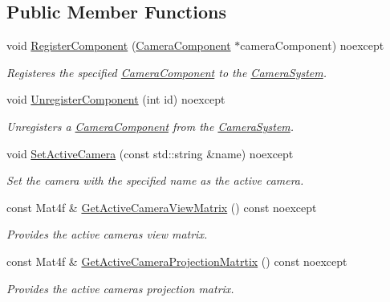 \subsection*{Public Member Functions}
\begin{DoxyCompactItemize}
\item 
void \hyperlink{class_blade_1_1_camera_system_a67a9d2ce6b3f06212dfe882dab6334c6}{Register\+Component} (\hyperlink{class_blade_1_1_camera_component}{Camera\+Component} $\ast$camera\+Component) noexcept
\begin{DoxyCompactList}\small\item\em Registeres the specified \hyperlink{class_blade_1_1_camera_component}{Camera\+Component} to the \hyperlink{class_blade_1_1_camera_system}{Camera\+System}. \end{DoxyCompactList}\item 
void \hyperlink{class_blade_1_1_camera_system_a295fdc352ab2c419940f43610cd06be7}{Unregister\+Component} (int id) noexcept
\begin{DoxyCompactList}\small\item\em Unregisters a \hyperlink{class_blade_1_1_camera_component}{Camera\+Component} from the \hyperlink{class_blade_1_1_camera_system}{Camera\+System}. \end{DoxyCompactList}\item 
void \hyperlink{class_blade_1_1_camera_system_a24ae6ba288185e4c2e915296e2b3a854}{Set\+Active\+Camera} (const std\+::string \&name) noexcept
\begin{DoxyCompactList}\small\item\em Set the camera with the specified name as the active camera. \end{DoxyCompactList}\item 
const Mat4f \& \hyperlink{class_blade_1_1_camera_system_a37ed2fa73706463322331377c6eb8a7f}{Get\+Active\+Camera\+View\+Matrix} () const noexcept
\begin{DoxyCompactList}\small\item\em Provides the active camera\textquotesingle{}s view matrix. \end{DoxyCompactList}\item 
const Mat4f \& \hyperlink{class_blade_1_1_camera_system_ab70602bec3fdc6fbfe26d90a789d40bc}{Get\+Active\+Camera\+Projection\+Matrtix} () const noexcept
\begin{DoxyCompactList}\small\item\em Provides the active camera\textquotesingle{}s projection matrix. \end{DoxyCompactList}\item 

\end{DoxyCompactItemize}
